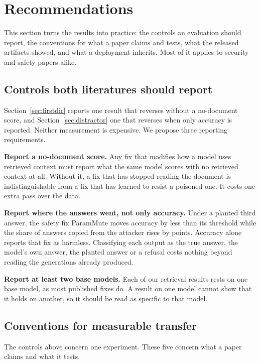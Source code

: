 \section{Recommendations}
\label{sec:discussion}

This section turns the results into practice: the controls an evaluation
should report, the conventions for what a paper claims and tests, what the
released artifacts showed, and what a deployment inherits. Most of it
applies to security and safety papers alike.

\subsection{Controls both literatures should report}

Section~\ref{sec:firstdir} reports one result that reverses
without a no-document score, and Section~\ref{sec:distractor} one that
reverses when only accuracy is reported. Neither measurement is
expensive. We propose three reporting requirements.

\textbf{Report a no-document score.} Any fix that modifies how a model uses
retrieved context must report what the same model scores with no retrieved
context at all. Without it, a fix that has stopped reading the document is
indistinguishable from a fix that has learned to resist a poisoned one.
It costs one extra pass over the data.

\textbf{Report where the answers went, not only accuracy.} Under a planted
third answer, the safety fix ParamMute moves accuracy by less than its threshold while the share of answers
copied from the attacker rises by \EPmDistCopyGain{} points. Accuracy alone
reports that fix as harmless. Classifying each output as the true
answer, the model's own answer, the planted answer or a refusal costs nothing
beyond reading the generations already produced.

\textbf{Report at least two base models.} Each of our retrieval results
rests on one base model, as most published fixes do. A result on one model
cannot show that it holds on another, so it should be read as specific to
that model.

\subsection{Conventions for measurable transfer}

The controls above concern one experiment. These five concern what a paper
claims and what it tests.

